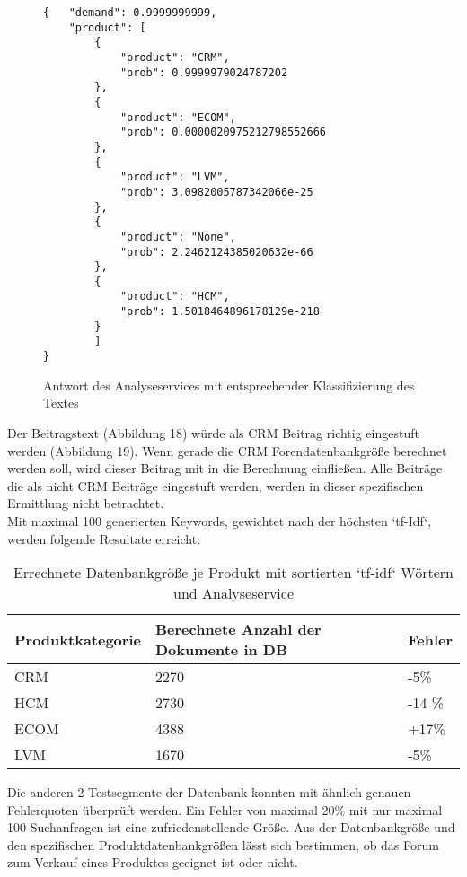 \newpage

\begin{figure}[h!]
\begin{lstlisting}[language=HTML5]
{   "demand": 0.9999999999,
    "product": [
        {
            "product": "CRM",
            "prob": 0.9999979024787202
        },
        {
            "product": "ECOM",
            "prob": 0.0000020975212798552666
        },
        {
            "product": "LVM",
            "prob": 3.0982005787342066e-25
        },
        {
            "product": "None",
            "prob": 2.2462124385020632e-66
        },
        {
            "product": "HCM",
            "prob": 1.5018464896178129e-218
        }
		]
}
\end{lstlisting}
\caption{Antwort des Analyseservices mit entsprechender Klassifizierung des Textes}
\end{figure}

Der Beitragstext (Abbildung 18) würde als CRM Beitrag richtig eingestuft werden (Abbildung 19). Wenn gerade die CRM Forendatenbankgröße berechnet werden soll, wird dieser Beitrag mit in die Berechnung einfließen. Alle Beiträge die als nicht CRM Beiträge eingestuft werden, werden in dieser spezifischen Ermittlung nicht betrachtet.\\
Mit maximal 100 generierten Keywords, gewichtet nach der höchsten `tf-Idf`, werden folgende Resultate erreicht:

\begin{table}[h!]
\begin{tabular}{ | p{3cm} | l | l |}
\hline
Produktkategorie & Berechnete Anzahl der Dokumente in DB & Fehler \\ \hline
CRM & 2270 & -5\% \\ \hline
HCM & 2730 & -14 \% \\ \hline
ECOM & 4388 & +17\% \\ \hline
LVM & 1670 & -5\% \\ \hline
\end{tabular}
\caption{Errechnete Datenbankgröße je Produkt mit sortierten `tf-idf` Wörtern und Analyseservice}
\end{table}

Die anderen 2 Testsegmente der Datenbank konnten mit ähnlich genauen Fehlerquoten überprüft werden.
Ein Fehler von maximal 20\% mit nur maximal 100 Suchanfragen ist eine zufriedenstellende Größe. Aus der Datenbankgröße und den spezifischen Produktdatenbankgrößen lässt sich bestimmen, ob das Forum zum Verkauf eines Produktes geeignet ist oder nicht.
